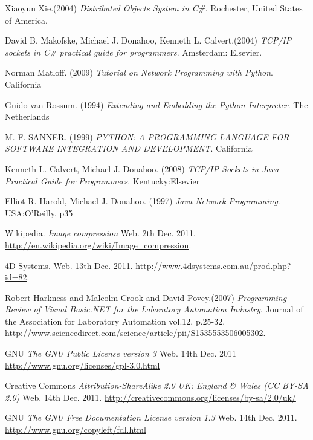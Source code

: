 \begin{thebibliography}{9}
	 Xiaoyun Xie.(2004) \textit{Distributed Objects System in C\#.} Rochester, United States of America. 

	 David B. Makofske, Michael J. Donahoo, Kenneth L. Calvert.(2004) \textit{TCP/IP sockets in C\#  practical guide for programmers}. Amsterdam: Elsevier.

	 Norman Matloff. (2009) \textit{Tutorial on Network Programming with Python}. California

	 Guido van Rossum. (1994) \textit{Extending and Embedding the Python Interpreter}. The Netherlands

	 M. F. SANNER. (1999) \textit{PYTHON: A PROGRAMMING LANGUAGE FOR SOFTWARE
INTEGRATION AND DEVELOPMENT}. California

	 Kenneth L. Calvert, Michael J. Donahoo. (2008) \textit{TCP/IP Sockets in Java
Practical Guide for Programmers}. Kentucky:Elsevier

	 Elliot R. Harold, Michael J. Donahoo. (1997) \textit{Java Network Programming}. USA:O'Reilly, p35

	 Wikipedia. \emph{Image compression} Web. 2th Dec. 2011. \url{http://en.wikipedia.org/wiki/Image_compression}.

	 4D Systems. Web. 13th Dec. 2011. \url{http://www.4dsystems.com.au/prod.php?id=82}.

	Robert Harkness and Malcolm Crook and David Povey.(2007) \textit{Programming Review of Visual Basic.NET for the Laboratory Automation Industry}. Journal of the Association for Laboratory Automation vol.12, p.25-32.
	\url{http://www.sciencedirect.com/science/article/pii/S1535553506005302}.

	 GNU \emph{The GNU Public License version 3} Web. 14th Dec. 2011 \url{http://www.gnu.org/licenses/gpl-3.0.html}

	 Creative Commons \emph{Attribution-ShareAlike 2.0 UK: England \& Wales (CC BY-SA 2.0)} Web. 14th Dec. 2011. \url{http://creativecommons.org/licenses/by-sa/2.0/uk/}
	
	 GNU \emph{The GNU Free Documentation License version 1.3} Web. 14th Dec. 2011. \url{http://www.gnu.org/copyleft/fdl.html}

\end{thebibliography} 
